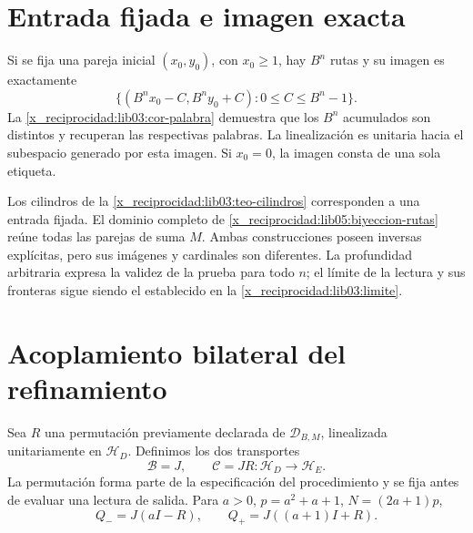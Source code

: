 \section{Entrada fijada e imagen exacta}
\label{x_reciprocidad:lib05:entrada-fija}

Si se fija una pareja inicial \((x_0,y_0)\), con \(x_0\geq1\),
hay \(B^n\) rutas y su imagen es exactamente
\begin{equation}
 \bigl\{(B^nx_0-C,B^ny_0+C):0\leq C\leq B^n-1\bigr\}.
 \label{x_reciprocidad:lib05:imagen-fija}
\end{equation}
La \cref{x_reciprocidad:lib03:cor-palabra} demuestra que los \(B^n\)
acumulados son distintos y recuperan las respectivas palabras. La
linealización es unitaria hacia el subespacio generado por esta
imagen. Si \(x_0=0\), la imagen consta de una sola etiqueta.

Los cilindros de la \cref{x_reciprocidad:lib03:teo-cilindros} corresponden a una
entrada fijada. El dominio completo de
\eqref{x_reciprocidad:lib05:biyeccion-rutas} reúne todas las parejas de suma \(M\).
Ambas construcciones poseen inversas explícitas, pero sus imágenes
y cardinales son diferentes. La profundidad arbitraria expresa la
validez de la prueba para todo \(n\); el límite de la lectura y
sus fronteras sigue siendo el establecido en la
\cref{x_reciprocidad:lib03:limite}.

\section{Acoplamiento bilateral del refinamiento}
\label{x_reciprocidad:lib05:bilateral}

Sea \(R\) una permutación previamente declarada de
\(\mathcal D_{B,M}\), linealizada unitariamente en
\(\mathscr H_D\). Definimos los dos transportes
\begin{equation}
 \mathcal B=J,\qquad \mathcal C=JR:
            \mathscr H_D\longrightarrow\mathscr H_E.
 \label{x_reciprocidad:lib05:dos-transportes}
\end{equation}
La permutación forma parte de la especificación del procedimiento
y se fija antes de evaluar una lectura de salida.
Para \(a>0\), \(p=a^2+a+1\), \(N=(2a+1)p\),
\begin{equation}
 Q_-=J(aI-R),\qquad Q_+=J((a+1)I+R).
 \label{x_reciprocidad:lib05:q-refinamiento}
\end{equation}

